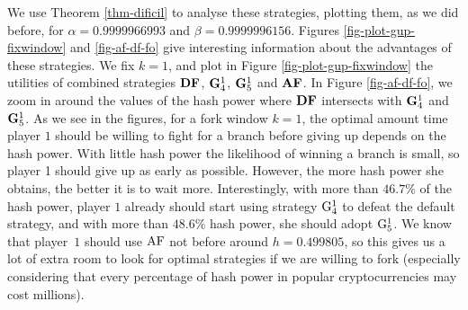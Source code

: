 \documentclass[a4paper,english,cleveref, autoref,numberwithinsect]{lipics-v2019}
\newcommand{\bdf}{\text{\rm {\bf DF}}}
\newcommand{\af}{\text{\rm AF}}
\newcommand{\baf}{\text{\rm {\bf AF}}}
\newcommand{\gup}{{\rm {G}}}
\newcommand{\bgup}{{\rm {\bf G}}}
\begin{document}
\begin{comment}
\end{eqnarray*}
    Also, for nonnegative integers $a,b,r$ such that $r>a$, let $\theta_{a,b}^r$ be the
 amount of such paths from $(0,0)$ to $(r,b)$ that do not exit the pentagon
 $\{(0,0),(a,0),(r,r-a),(r,b),(0,b)\}$. Then we have the following:
 $$
\theta_{a,b}^r = \displaystyle \sigma_{|b-r|,\min(r,b)} + \sum_{i=\max(1,r-b+1)}^a  \bigg(\sum_{j=0}^{r-i}\sigma_{i-1,j}\cdot \sigma_{i+b-r,r-i-j} \bigg).
 $$
 \end{lemma}
 For the proof, we write the utility as given in Definition \ref{def-utility}, separate the summation 
 over the five cases explained above, and then show that these sums can be expressed in terms of the 
 generating polynomials associated to the sequences $\sigma_{a,b}$ and $\theta_{a,b}^r$, which we
refer to as \textit{Trapezoidal and Pentagonal Dyck polynomials}.
\qed

\medskip
\end{comment}

We use Theorem \ref{thm-dificil} to analyse these strategies, plotting them, as we did before, 
for $\alpha = 0.9999966993$ and $\beta = 0.9999996156$. Figures  \ref{fig-plot-gup-fixwindow} and \ref{fig-af-df-fo} give 
interesting 
information about the advantages of these strategies. 
We fix $k = 1$, and plot in Figure \ref{fig-plot-gup-fixwindow} the utilities of combined strategies $\bdf$, $\bgup^1_4$, $\bgup^1_5$ and $\baf$. In Figure \ref{fig-af-df-fo}, we zoom in around the values of the hash power where $\bdf$ intersects with $\bgup^1_4$ and $\bgup^1_5$.
As we see in the figures, for a 
fork window $k = 1$, the optimal amount time player $1$ should be willing to fight for a branch before giving up depends on the hash power. With little hash power the likelihood of winning a 
branch is small, so player 1 should give up as early as possible. However, the more hash power she obtains, the better it is to wait more. Interestingly, with more than 
$46.7\%$ of the hash power, player $1$ already should start using strategy $\gup^1_4$ to defeat the default strategy, and with more than $48.6\%$ hash power, she should adopt $\gup^1_5$. We know that player~$1$ should use $\af$ not before around $h = 0.499805$, so this gives us a lot of extra room to look for optimal strategies if we are willing to fork (especially considering that every percentage of hash power in popular cryptocurrencies 
may cost millions).
\end{document}
